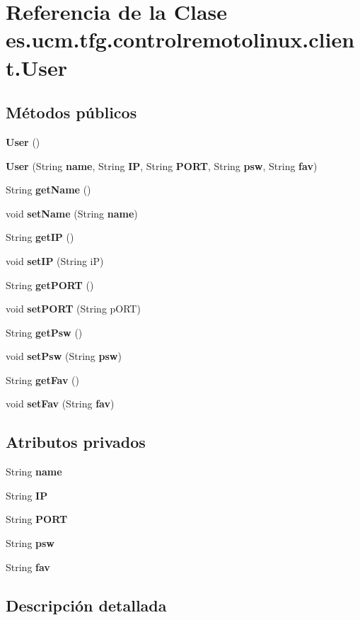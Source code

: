 \section{Referencia de la Clase es.\-ucm.\-tfg.\-controlremotolinux.\-client.\-User}
\label{classes_1_1ucm_1_1tfg_1_1controlremotolinux_1_1client_1_1User}
\subsection*{Métodos públicos}
\begin{DoxyCompactItemize}
\item 
{\bf User} ()
\item 
{\bf User} (String {\bf name}, String {\bf I\-P}, String {\bf P\-O\-R\-T}, String {\bf psw}, String {\bf fav})
\item 
String {\bf get\-Name} ()
\item 
void {\bf set\-Name} (String {\bf name})
\item 
String {\bf get\-I\-P} ()
\item 
void {\bf set\-I\-P} (String i\-P)
\item 
String {\bf get\-P\-O\-R\-T} ()
\item 
void {\bf set\-P\-O\-R\-T} (String p\-O\-R\-T)
\item 
String {\bf get\-Psw} ()
\item 
void {\bf set\-Psw} (String {\bf psw})
\item 
String {\bf get\-Fav} ()
\item 
void {\bf set\-Fav} (String {\bf fav})
\end{DoxyCompactItemize}
\subsection*{Atributos privados}
\begin{DoxyCompactItemize}
\item 
String {\bf name}
\item 
String {\bf I\-P}
\item 
String {\bf P\-O\-R\-T}
\item 
String {\bf psw}
\item 
String {\bf fav}
\end{DoxyCompactItemize}


\subsection{Descripción detallada}


